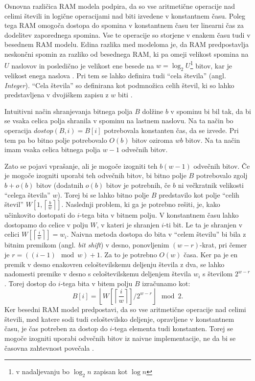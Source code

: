 Osnovna različica RAM modela podpira, da so vse aritmetične operacije nad celimi števili in logične operacijami nad biti izvedene v konstantnem času. Poleg tega RAM omogoča dostopa do spomina v konstantnem času ter linearni čas za dodelitev zaporednega spomina. Vse te operacije so storjene v enakem času tudi v besednem RAM modelu. Edina razlika med modeloma je, da RAM predpostavlja neskončni spomin za razliko od besednega RAM, ki pa omeji velikost spomina na $U$ naslovov in posledično je velikost ene besede na $w=\log_2 U$\footnote{v nadaljevanju bo $\log_2 n$ zapisan kot $\log n$} bitov, kar je velikost enega naslova \cite{Fredman1990,Morin2013,Navarro2016}. Pri tem se lahko definira tudi \enquote{cela števila} (angl. \textit{Integer}). \enquote{Cela števila} so definirana kot podmnožica celih števil, ki so lahko predstavljena v dvojiškem zapisu z $w$ biti \cite{Navarro2016}.

Intuitivni način shranjevanja bitnega polja $B$ dolžine $b$ v spominu bi bil tak, da bi se vsaka celica polja shranila v spominu na lastnem naslovu. Na ta način bo operacija $dostop(B,i)=B[i]$ potrebovala konstanten čas, da se izvede. Pri tem pa bo bitno polje potrebovalo $O(b)$ bitov oziroma $wb$ bitov. Na ta način imam vsaka celica bitnega polja $w-1$ odvečnih bitov. 

Zato se pojavi vprašanje, ali je mogoče izogniti teh $b(w-1)$ odvečnih bitov. Če je mogoče izogniti uporabi teh odvečnih bitov, bi bitno polje $B$ potrebovalo zgolj $b+o(b)$ bitov (dodatnih $o(b)$ bitov je potrebnih, če $b$ ni večkratnik velikosti \enquote{celega števila} $w$). Torej bi se lahko bitno polje $B$ predstavilo kot polje \enquote{celih števil} $W\left[1,\left\lceil\frac{b}{w}\right\rceil\right]$. Naslednji problem, ki ga je potrebno rešiti, je, kako učinkovito dostopati do $i$-tega bita v bitnem polju. V konstantnem času lahko dostopamo do celice v polju $W$, v kateri je shranjen $i$-ti bit. Le ta je shranjen v celici $W\left[\left\lceil\frac{i}{w}\right\rceil\right]=w_i$. Naivna metoda dostopa do bita v \enquote{celem številu} bi bila z bitnim premikom (angl. \textit{bit shift}) v desno, ponovljenim $(w-r)$-krat, pri čemer je $r=((i-1)\mod{w}) +1$. Za to je potrebno $O(w)$ časa. Ker pa je en premik v desno enakovren celoštevilskemu deljenju števila z dva, se lahko nadomesti premike v desno s celoštevilskemu deljenjem števila $w_i$ s številom $2^{w-r}$. Torej dostop do $i$-tega bita v bitem polju $B$ izračunamo kot:
$$
    B[i]=\left\lfloor W\left[\left\lceil\frac{i}{w}\right\rceil\right]/2^{w-r}\right\rfloor \mod{2}.
$$
Ker besedni RAM model predpostavi, da so vse aritmetične operacije nad celimi števili, med katere sodi tudi celoštevilsko deljenje, opravljene v konstantnem času, je čas potreben za dostop do $i$-tega elementa tudi konstanten. Torej se mogoče izogniti uporabi odvečnih bitov iz naivne implementacije, ne da bi se časovna zahtevnost povečala \cite{Navarro2016}.

